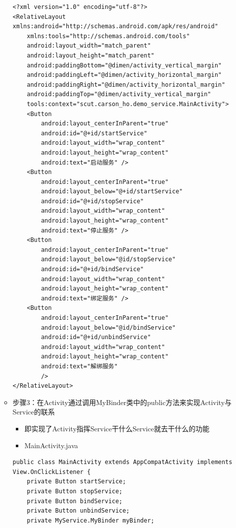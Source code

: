 \documentclass[9pt, b5paper]{article}
\begin{document}
\begin{enumerate}
\begin{itemize}
\begin{verbatim}
<?xml version="1.0" encoding="utf-8"?>
<RelativeLayout xmlns:android="http://schemas.android.com/apk/res/android"
    xmlns:tools="http://schemas.android.com/tools"
    android:layout_width="match_parent"
    android:layout_height="match_parent"
    android:paddingBottom="@dimen/activity_vertical_margin"
    android:paddingLeft="@dimen/activity_horizontal_margin"
    android:paddingRight="@dimen/activity_horizontal_margin"
    android:paddingTop="@dimen/activity_vertical_margin"
    tools:context="scut.carson_ho.demo_service.MainActivity">
    <Button
        android:layout_centerInParent="true"
        android:id="@+id/startService"
        android:layout_width="wrap_content"
        android:layout_height="wrap_content"
        android:text="启动服务" />
    <Button
        android:layout_centerInParent="true"
        android:layout_below="@+id/startService"
        android:id="@+id/stopService"
        android:layout_width="wrap_content"
        android:layout_height="wrap_content"
        android:text="停止服务" />
    <Button
        android:layout_centerInParent="true"
        android:layout_below="@id/stopService"
        android:id="@+id/bindService"
        android:layout_width="wrap_content"
        android:layout_height="wrap_content"
        android:text="绑定服务" />
    <Button
        android:layout_centerInParent="true"
        android:layout_below="@id/bindService"
        android:id="@+id/unbindService"
        android:layout_width="wrap_content"
        android:layout_height="wrap_content"
        android:text="解绑服务"
        />
</RelativeLayout>
\end{verbatim}
\item 步骤3：在Activity通过调用MyBinder类中的public方法来实现Activity与Service的联系
\begin{itemize}
\item 即实现了Activity指挥Service干什么Service就去干什么的功能
\item MainActivity.java
\end{itemize}
\begin{verbatim}
public class MainActivity extends AppCompatActivity implements View.OnClickListener {
    private Button startService;
    private Button stopService;
    private Button bindService;
    private Button unbindService;
    private MyService.MyBinder myBinder;
    

\end{verbatim}
\end{itemize}
\end{enumerate}
\end{document}
